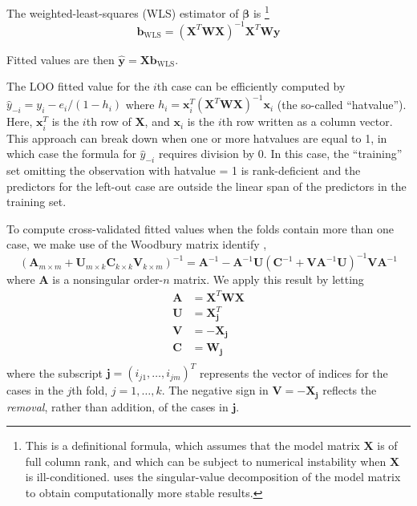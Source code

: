 \documentclass[
]{jss}
\begin{document}
The weighted-least-squares (WLS) estimator of \(\boldsymbol{\beta}\) is
\citep[see, e.g.,][Sec. 12.2.2]{Fox:2016} \footnote{This is a
  definitional formula, which assumes that the model matrix
  \(\mathbf{X}\) is of full column rank, and which can be subject to
  numerical instability when \(\mathbf{X}\) is ill-conditioned.
   uses the singular-value decomposition of the model matrix
  to obtain computationally more stable results.} \[
\mathbf{b}_{\mathrm{WLS}} = \left( \mathbf{X}^T \mathbf{W} \mathbf{X} \right)^{-1} 
  \mathbf{X}^T \mathbf{W} \mathbf{y}
\]

Fitted values are then
\(\widehat{\mathbf{y}} = \mathbf{X}\mathbf{b}_{\mathrm{WLS}}\).

The LOO fitted value for the \(i\)th case can be efficiently computed by
\(\widehat{y}_{-i} = y_i - e_i/(1 - h_i)\) where
\(h_i = \mathbf{x}^T_i \left( \mathbf{X}^T \mathbf{W} \mathbf{X} \right)^{-1} \mathbf{x}_i\)
(the so-called ``hatvalue''). Here, \(\mathbf{x}^T_i\) is the \(i\)th
row of \(\mathbf{X}\), and \(\mathbf{x}_i\) is the \(i\)th row written
as a column vector. This approach can break down when one or more
hatvalues are equal to 1, in which case the formula for
\(\widehat{y}_{-i}\) requires division by 0. In this case, the
``training'' set omitting the observation with hatvalue = 1 is
rank-deficient and the predictors for the left-out case are outside the
linear span of the predictors in the training set.

To compute cross-validated fitted values when the folds contain more
than one case, we make use of the Woodbury matrix identify
\citep{Hager:1989}, \[
\left(\mathbf{A}_{m \times m} + \mathbf{U}_{m \times k} 
\mathbf{C}_{k \times k} \mathbf{V}_{k \times m} \right)^{-1} = \mathbf{A}^{-1} - \mathbf{A}^{-1}\mathbf{U} \left(\mathbf{C}^{-1} + 
\mathbf{VA}^{-1}\mathbf{U} \right)^{-1} \mathbf{VA}^{-1}
\] where \(\mathbf{A}\) is a nonsingular order-\(n\) matrix. We apply
this result by letting \begin{align*}
    \mathbf{A} &= \mathbf{X}^T \mathbf{W} \mathbf{X} \\
    \mathbf{U} &= \mathbf{X}_\mathbf{j}^T \\
    \mathbf{V} &= - \mathbf{X}_\mathbf{j} \\
    \mathbf{C} &= \mathbf{W}_\mathbf{j} \\
\end{align*} where the subscript
\(\mathbf{j} = (i_{j1}, \ldots, i_{jm})^T\) represents the vector of
indices for the cases in the \(j\)th fold, \(j = 1, \ldots, k\). The
negative sign in \(\mathbf{V} = - \mathbf{X}_\mathbf{j}\) reflects the
\emph{removal}, rather than addition, of the cases in \(\mathbf{j}\).
\end{document}

